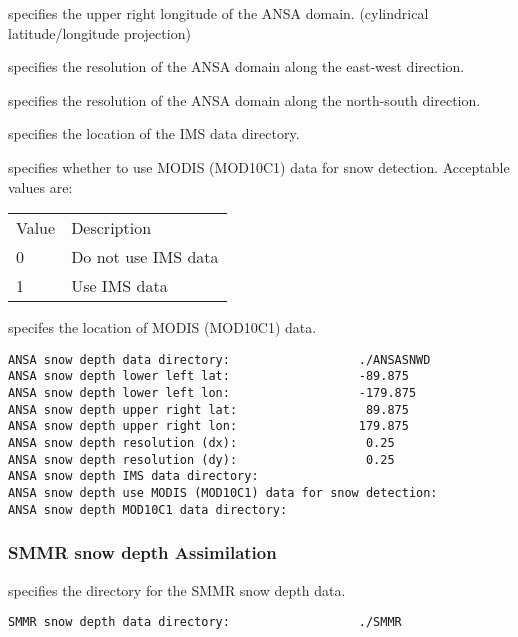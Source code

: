   specifies the upper right
 longitude of the ANSA domain. (cylindrical latitude/longitude
 projection)

  specifies the resolution
 of the ANSA domain along the east-west direction.

  specifies the resolution
 of the ANSA domain along the north-south direction.

  specifies the location
 of the IMS data directory.

 specifies whether to use MODIS (MOD10C1) data for snow detection.
 Acceptable values are:

 \begin{tabular}{ll}
 Value & Description                  \\
  0    & Do not use IMS data          \\
  1    & Use IMS data                 \\
 \end{tabular}

  specifes the location
 of MODIS (MOD10C1) data.
 

 \begin{Verbatim}[frame=single]
ANSA snow depth data directory:                  ./ANSASNWD
ANSA snow depth lower left lat:                  -89.875
ANSA snow depth lower left lon:                  -179.875
ANSA snow depth upper right lat:                  89.875
ANSA snow depth upper right lon:                 179.875
ANSA snow depth resolution (dx):                  0.25
ANSA snow depth resolution (dy):                  0.25
ANSA snow depth IMS data directory:
ANSA snow depth use MODIS (MOD10C1) data for snow detection:
ANSA snow depth MOD10C1 data directory:
 \end{Verbatim}
 

 
 
 \subsubsection{SMMR snow depth Assimilation}
 \label{sssec:smmrsnowdepthda}
 

 
  specifies the directory for the
 SMMR snow depth data.
 

 \begin{Verbatim}[frame=single]
SMMR snow depth data directory:                  ./SMMR
 \end{Verbatim}
 

